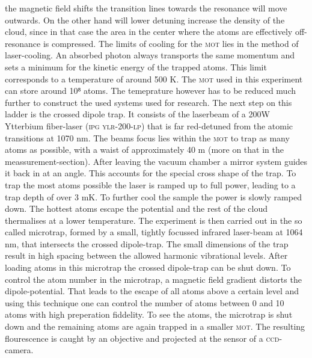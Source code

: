 the magnetic field shifts the transition lines towards the resonance will move outwards. On the other hand will lower detuning increase the density of the cloud, since in that case the area in the center where the atoms are effectively off-resonance is compressed. The limits of cooling for the \textsc{mot} lies in the method of laser-cooling. An absorbed photon always transports the same momentum and sets a minimum for the kinetic energy of the trapped atoms. This limit corresponds to a temperature of around 500 \mu K. The \textsc{mot} used in this experiment can store around 10⁸ atoms. The temeprature however has to be reduced much further to construct the used systems used for research. The next step on this ladder is the crossed dipole trap. It consists of the laserbeam of a 200W Ytterbium fiber-laser (\textsc{ipg ylr-200-lp}) that is far red-detuned from the atomic transitions at 1070 nm. The beams focus lies within the \textsc{mot} to trap as many atoms as possible, with a waist of approximately 40 \mu m (more on that in the meassurement-section). After leaving the vacuum chamber a mirror system guides it back in at an angle. This accounts for the special cross shape of the trap. To trap the most atoms possible the laser is ramped up to full power, leading to a trap depth of over 3 mK. To further cool the sample the power is slowly ramped down. The hottest atoms escape the potential and the rest of the cloud thermalises at a lower temperature. The experiment is then carried out in the so called microtrap, formed by a small, tightly focussed infrared laser-beam at 1064 nm, that intersects the crossed dipole-trap. The small dimensions of the trap result in high spacing between the allowed harmonic vibrational levels. After loading atoms in this microtrap the crossed dipole-trap can be shut down. To control the atom number in the microtrap, a magnetic field gradient distorts the dipole-potential. That leads to the escape of all atoms above a certain level and using this technique one can control the number of atoms between 0 and 10 atoms with high preperation fiddelity. To see the atoms, the microtrap is shut down and the remaining atoms are again trapped in a smaller \textsc{mot}. The resulting flourescence is caught by an objective and projected at the sensor of a \textsc{ccd}-camera. 
